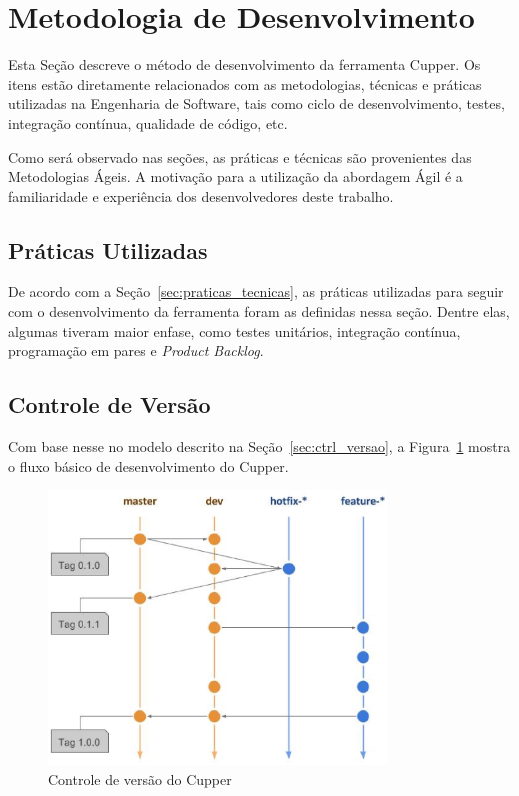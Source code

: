 \section{Metodologia de Desenvolvimento}
\label{sec:desenvolvimento}

Esta Seção descreve o método de desenvolvimento da ferramenta Cupper.
Os itens estão diretamente relacionados com as metodologias, técnicas e
práticas utilizadas na Engenharia de Software, tais como ciclo de
desenvolvimento, testes, integração contínua, qualidade de código, etc.

Como será observado nas seções, as práticas e técnicas são provenientes
das Metodologias Ágeis. A motivação para a utilização da abordagem
Ágil é a familiaridade e experiência dos desenvolvedores deste trabalho.


\subsection{Práticas Utilizadas}
\label{sec:prat_ut}

De acordo com a Seção~\ref{sec:praticas_tecnicas}, as práticas utilizadas
para seguir com o desenvolvimento da ferramenta foram as definidas nessa seção.
Dentre elas, algumas tiveram maior enfase, como testes unitários, integração contínua,
programação em pares e \textit{Product Backlog}.

\subsection{Controle de Versão}
\label{sec:ctrl_versao_met}

Com base nesse no modelo descrito na Seção~\ref{sec:ctrl_versao}, a Figura~\ref{fig:ctrl_versao}
mostra o fluxo básico de desenvolvimento do Cupper.

\begin{figure}[]
  \centering
  \includegraphics[width=0.8\textwidth]{figuras/controle_versao}
  \caption{Controle de versão do Cupper}
  \label{fig:ctrl_versao}
\end{figure}

